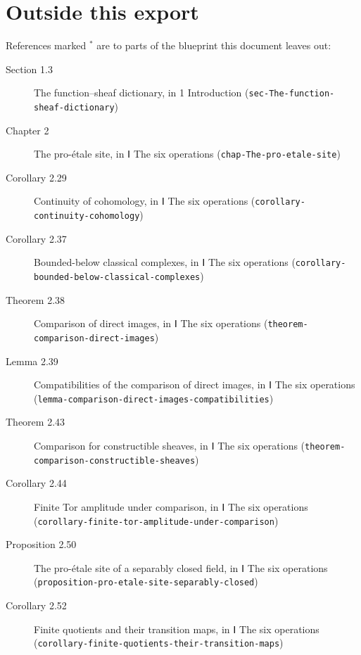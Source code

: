 \documentclass[11pt]{article}
\newcommand{\bpslug}[1]{\texttt{#1}}
\begin{document}
\section*{Outside this export}
References marked \ensuremath{{}^\ast} are to parts of the blueprint this document leaves out:
\begin{description}
\item[Section 1.3] The function–sheaf dictionary, in 1 Introduction (\bpslug{sec-{}\allowbreak{}The-{}\allowbreak{}function-{}\allowbreak{}sheaf-{}\allowbreak{}dictionary})
\item[Chapter 2] The pro-étale site, in Ⅰ The six operations (\bpslug{chap-{}\allowbreak{}The-{}\allowbreak{}pro-{}\allowbreak{}etale-{}\allowbreak{}site})
\item[Corollary 2.29] Continuity of cohomology, in Ⅰ The six operations (\bpslug{corollary-{}\allowbreak{}continuity-{}\allowbreak{}cohomology})
\item[Corollary 2.37] Bounded-below classical complexes, in Ⅰ The six operations (\bpslug{corollary-{}\allowbreak{}bounded-{}\allowbreak{}below-{}\allowbreak{}classical-{}\allowbreak{}complexes})
\item[Theorem 2.38] Comparison of direct images, in Ⅰ The six operations (\bpslug{theorem-{}\allowbreak{}comparison-{}\allowbreak{}direct-{}\allowbreak{}images})
\item[Lemma 2.39] Compatibilities of the comparison of direct images, in Ⅰ The six operations (\bpslug{lemma-{}\allowbreak{}comparison-{}\allowbreak{}direct-{}\allowbreak{}images-{}\allowbreak{}compatibilities})
\item[Theorem 2.43] Comparison for constructible sheaves, in Ⅰ The six operations (\bpslug{theorem-{}\allowbreak{}comparison-{}\allowbreak{}constructible-{}\allowbreak{}sheaves})
\item[Corollary 2.44] Finite Tor amplitude under comparison, in Ⅰ The six operations (\bpslug{corollary-{}\allowbreak{}finite-{}\allowbreak{}tor-{}\allowbreak{}amplitude-{}\allowbreak{}under-{}\allowbreak{}comparison})
\item[Proposition 2.50] The pro-étale site of a separably closed field, in Ⅰ The six operations (\bpslug{proposition-{}\allowbreak{}pro-{}\allowbreak{}etale-{}\allowbreak{}site-{}\allowbreak{}separably-{}\allowbreak{}closed})
\item[Corollary 2.52] Finite quotients and their transition maps, in Ⅰ The six operations (\bpslug{corollary-{}\allowbreak{}finite-{}\allowbreak{}quotients-{}\allowbreak{}their-{}\allowbreak{}transition-{}\allowbreak{}maps})

\end{description}
\end{document}
